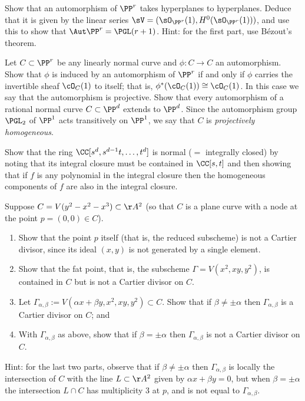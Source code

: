 \begin{exercise}\label{aut Pr}
Show that an automorphism of $\PP^r$ takes hyperplanes to hyperplanes. Deduce that it is given by the linear series
$\sV = (\sO_{\PP^r}(1), H^0(\sO_{\PP^r}(1)))$, and use this to show that $\Aut \PP^r = \PGL(r+1)$. Hint: for the first part, use B\'ezout's theorem.
\end{exercise}

\begin{exercise}\label{projective automorphism}
Let $C \subset \PP^r$ be any linearly normal curve and $\phi: C \to C$ an automorphism. Show that $\phi$ is induced by an automorphism of $\PP^r$ if and only if $\phi$ carries the invertible sheaf $\cO_{C}(1)$ to itself; that is, $\phi^*(\cO_{C}(1)) \cong \cO_{C}(1)$. In this case we say that the automorphism
is projective. Show that every automorphism of a rational normal curve $C \subset \PP^d$  extends to $\PP^d$. Since the
automorphism group $\PGL_2$ of $\PP^1$ acts transitively on $\PP^1$, we say that
$C$ is \emph{projectively homogeneous}.
\end{exercise}

\begin{exercise}\label{normality of RNC}
 Show that the ring $\CC[s^d,s^{d-1}t,\dots, t^d]$ is normal ($=$ integrally closed) by noting that its integral closure must be
 contained in $\CC[s,t]$ and then showing that if $f$ is any polynomial
 in the integral closure then the homogeneous components of $f$ are also in the integral closure.
\end{exercise}

\begin{exercise}\label{Cartier examples}
Suppose $C = V(y^2 - x^2 - x^3) \subset \AA^2$ (so that $C$ is a plane curve with a node at the point $p = (0,0) \in C$). 
\begin{enumerate}
\item Show that the point $p$ itself (that is, the reduced subscheme) is not a Cartier divisor, since its ideal $(x,y)$ is not generated by a single element. 
\item Show that the fat point, that is, the subscheme $\Gamma = V(x^2,
  xy, y^2)$, is contained in $C$ but is not a Cartier divisor on $C$. 
\item Let $\Gamma_{\alpha, \beta} := V(\alpha x + \beta y, x^2, xy, y^2) \subset C$. Show that if $\beta \neq \pm \alpha$ then $\Gamma_{\alpha, \beta}$ is a Cartier divisor on $C$; and
\item With $\Gamma_{\alpha, \beta}$ as above, show that if $\beta = \pm \alpha$ then $\Gamma_{\alpha, \beta}$ is not a Cartier divisor on $C$.
\end{enumerate}

Hint: for the last two parts, observe that if $\beta \neq \pm \alpha$ then $\Gamma_{\alpha, \beta}$  is locally the intersection of $C$ with the line $L \subset \AA^2$ given by $\alpha x + \beta y = 0$, but when $\beta = \pm \alpha$ 
the intersection $L \cap C$ has multiplicity 3 at $p$, and is not equal to $\Gamma_{\alpha, \beta}$.
\end{exercise}


